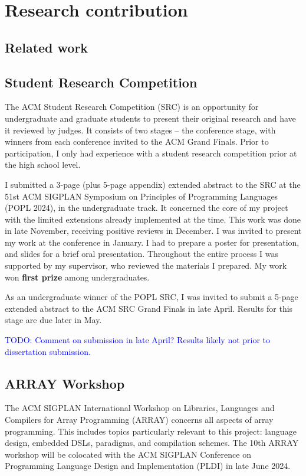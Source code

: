 \section{Research contribution}

\subsection{Related work}

\subsection{Student Research Competition}

The ACM Student Research Competition (SRC) is an opportunity for undergraduate and graduate students to present their original research and have it reviewed by judges. 
It consists of two stages -- the conference stage, with winners from each conference invited to the ACM Grand Finals. 
Prior to participation, I only had experience with a student research competition prior at the high school level.

I submitted a 3-page (plus 5-page appendix) extended abstract to the SRC at the 51st ACM SIGPLAN Symposium on Principles of Programming Languages (POPL 2024), in the undergraduate track.
It concerned the core of my project with the limited extensions already implemented at the time.
This work was done in late November, receiving positive reviews in December. 
I was invited to present my work at the conference in January. 
I had to prepare a poster for presentation, and slides for a brief oral presentation. 
Throughout the entire process I was supported by my supervisor, who reviewed the materials I prepared.
My work won \textbf{first prize} among undergraduates. 

As an undergraduate winner of the POPL SRC, I was invited to submit a 5-page extended abstract to the ACM SRC Grand Finals in late April. Results for this stage are due later in May.

\begin{center}
    \textcolor{blue}{TODO: Comment on submission in late April? Results likely not prior to dissertation submission. }
\end{center}

\subsection{ARRAY Workshop}

The ACM SIGPLAN International Workshop on Libraries, Languages and Compilers for Array Programming (ARRAY) concerns all aspects of array programming. 
This includes topics particularly relevant to this project: language design, embedded DSLs, paradigms, and compilation schemes.
The 10th ARRAY workshop will be colocated with the ACM SIGPLAN Conference on Programming Language Design and Implementation (PLDI) in late June 2024.

